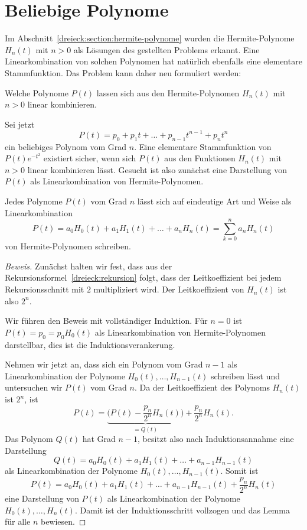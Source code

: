 %
%
%
\section{Beliebige Polynome
\label{dreieck:section:beliebig}}
Im Abschnitt~\ref{dreieck:section:hermite-polynome} wurden die
Hermite-Polynome $H_n(t)$ mit $n>0$ als Lösungen des gestellten
Problems erkannt.
Eine Linearkombination von solchen Polynomen hat natürlich
ebenfalls eine elementare Stammfunktion.
Das Problem kann daher neu formuliert werden:

\begin{problem}
\label{dreieck:problem2}
Welche Polynome $P(t)$ lassen sich aus den Hermite-Polynomen
$H_n(t)$ mit $n>0$ linear kombinieren.
\end{problem}

Sei jetzt
\[
P(t) = p_0 + p_1t + \ldots + p_{n-1}t^{n-1} + p_nt^n
\]
ein beliebiges Polynom vom Grad $n$.
Eine elementare Stammfunktion von $P(t)e^{-t^2}$ existiert sicher,
wenn sich $P(t)$ aus den Funktionen $H_n(t)$ mit $n>0$ linear
kombinieren lässt.
Gesucht ist also zunächst eine Darstellung von $P(t)$ als Linearkombination
von Hermite-Polynomen.

\begin{lemma}
Jedes Polynome $P(t)$ vom Grad $n$ lässt sich auf eindeutige Art und
Weise als Linearkombination
\begin{equation}
P(t) = a_0H_0(t) + a_1H_1(t) + \ldots + a_nH_n(t)
=
\sum_{k=0}^n a_nH_n(t)
\label{dreieck:lemma}
\end{equation}
von Hermite-Polynomen schreiben.
\end{lemma}

\begin{proof}[Beweis]
Zunächst halten wir fest, dass aus der
Rekursionsformel~\eqref{dreieck:rekursion}
folgt, dass der Leitkoeffizient bei jedem Rekursionsschnitt
mit $2$ multipliziert wird.
Der Leitkoeffizient von $H_n(t)$ ist also $2^n$.

Wir führen den Beweis mit vollständiger Induktion.
Für $n=0$ ist $P(t)=p_0 = p_0 H_0(t)$ als Linearkombination von
Hermite-Polynomen darstellbar, dies ist die Induktionsverankerung.

Nehmen wir jetzt an, dass sich ein Polynom vom Grad $n-1$ als
Linearkombination der Polynome $H_0(t),\dots,H_{n-1}(t)$ schreiben
lässt und untersuchen wir $P(t)$ vom Grad $n$.
Da der Leitkoeffizient des Polynoms $H_n(t)$ ist $2^n$, ist
\[
P(t)
=
\underbrace{\biggl(P(t) - \frac{p_n}{2^n} H_n(t)\biggr)}_{\displaystyle = Q(t)}
+
\frac{p_n}{2^n} H_n(t).
\]
Das Polynom $Q(t)$ hat Grad $n-1$, besitzt also nach Induktionsannahme
eine Darstellung
\[
Q(t) = a_0H_0(t)+a_1H_1(t)+\ldots+a_{n-1}H_{n-1}(t)
\]
als Linearkombination der Polynome $H_0(t),\dots,H_{n-1}(t)$.
Somit ist
\[
P(t)
= a_0H_0(t)+a_1H_1(t)+\ldots+a_{n-1}H_{n-1}(t) +
\frac{p_n}{2^n} H_n(t)
\]
eine Darstellung von $P(t)$ als Linearkombination der Polynome
$H_0(t),\dots,H_n(t)$.
Damit ist der Induktionsschritt vollzogen und das Lemma für alle
$n$ bewiesen.
\end{proof}

